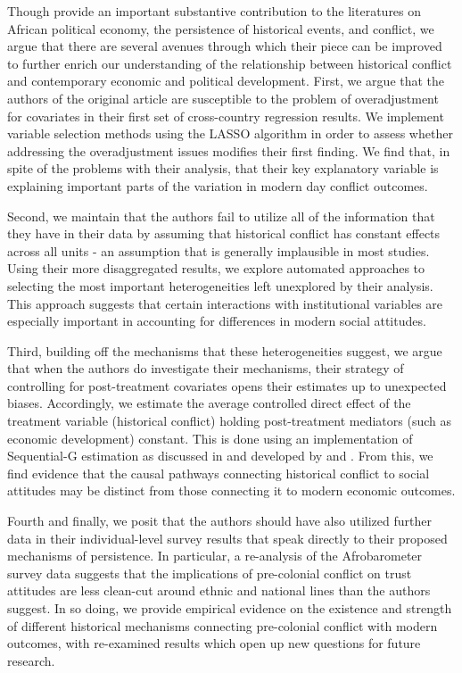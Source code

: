 Though \citet{BesleyRQ2014} provide an important substantive contribution to the literatures on African political economy, the persistence of historical events, and conflict, we argue that there are several avenues through which their piece can be improved to further enrich our understanding of the relationship between historical conflict and contemporary economic and political development. First, we argue that the authors of the original article are susceptible to the problem of overadjustment for covariates \citep{SchistermanColePlatt2009} in their first set of cross-country regression results. We implement variable selection methods using the LASSO algorithm \citep{tibshirani1996regression} in order to assess whether addressing the overadjustment issues modifies their first finding. We find that, in spite of the problems with their analysis, that their key explanatory variable is explaining important parts of the variation in modern day conflict outcomes.

Second, we maintain that the authors fail to utilize all of the information that they have in their data by assuming that historical conflict has constant effects across all units - an assumption that is generally implausible in most studies. Using their more disaggregated results, we explore automated approaches to selecting the most important heterogeneities left unexplored by their analysis. This approach suggests that certain interactions with institutional variables are especially important in accounting for differences in modern social attitudes. 

Third, building off the mechanisms that these heterogeneities suggest, we argue that when the authors do investigate their mechanisms, their strategy of controlling for post-treatment covariates opens their estimates up to unexpected biases. Accordingly, we estimate the average controlled direct effect of the treatment variable (historical conflict) holding post-treatment mediators (such as economic development) constant. This is done using an implementation of Sequential-G estimation as discussed in \citet{AcharyaBlackwellSen2016} and developed by \citet{JoffeGreene2009} and \citet{Vansteelandt2009}. From this, we find evidence that the causal pathways connecting historical conflict to social attitudes may be distinct from those connecting it to modern economic outcomes. 

Fourth and finally, we posit that the authors should have also utilized further data in their individual-level survey results that speak directly to their proposed mechanisms of persistence. In particular, a re-analysis of the Afrobarometer survey data suggests that the implications of pre-colonial conflict on trust attitudes are less clean-cut around ethnic and national lines than the authors suggest. In so doing, we provide empirical evidence on the existence and strength of different historical mechanisms connecting pre-colonial conflict with modern outcomes, with re-examined results which open up new questions for future research. 